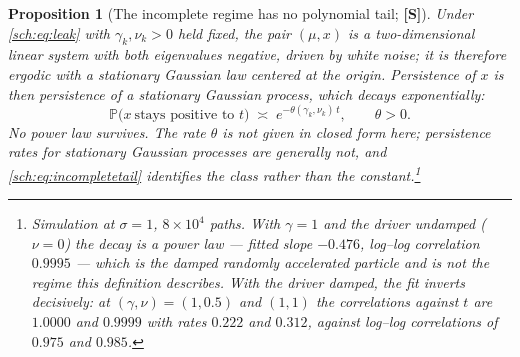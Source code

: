 \documentclass[11pt]{article}
\numberwithin{equation}{section}
\theoremstyle{plain}
\newtheorem{proposition}[theorem]{Proposition}
\theoremstyle{definition}
\theoremstyle{remark}
\newcommand{\PP}{\mathbb{P}}
\begin{document}
\begin{proposition}[The incomplete regime has no polynomial tail;
\textbf{[S]}]\label{sch:prop:exponent}
Under \eqref{sch:eq:leak} with $\gamma_k,\nu_k>0$ held fixed, the pair
$(\mu,x)$ is a two-dimensional linear system with both eigenvalues
negative, driven by white noise; it is therefore ergodic with a
stationary Gaussian law centered at the origin. Persistence of $x$ is then
persistence of a stationary Gaussian process, which decays
\emph{exponentially}:
\begin{equation}\label{sch:eq:incompletetail}
\PP\bigl(x\ \text{stays positive to }t\bigr)\;\asymp\;e^{-\theta(\gamma_k,\nu_k)\,t},
\qquad \theta>0 .
\end{equation}
No power law survives. The rate $\theta$ is not given in closed form
here; persistence rates for stationary Gaussian processes are generally
not, and \eqref{sch:eq:incompletetail} identifies the class rather than
the constant.\footnote{Simulation at $\sigma=1$, $8\times10^{4}$ paths.
With $\gamma=1$ and the driver \emph{undamped} ($\nu=0$) the decay is a
power law --- fitted slope $-0.476$, log--log correlation $0.9995$ ---
which is the damped randomly accelerated particle and is not the regime
this definition describes. With the driver damped, the fit inverts
decisively: at $(\gamma,\nu)=(1,0.5)$ and $(1,1)$ the correlations
against $t$ are $1.0000$ and $0.9999$ with rates $0.222$ and $0.312$,
against log--log correlations of $0.975$ and $0.985$.}
\end{proposition}
\end{document}

